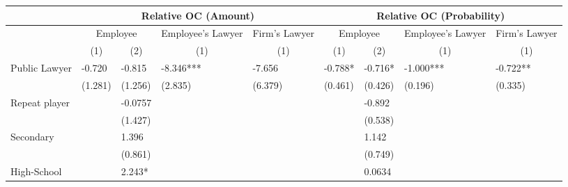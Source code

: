 \begin{tabular}{lrrrrrrrr}
\toprule
      & \multicolumn{4}{c}{Relative OC (Amount)} & \multicolumn{4}{c}{Relative OC (Probability)} \\
\midrule
      & \multicolumn{2}{c}{Employee} & \multicolumn{1}{c}{Employee's Lawyer} & \multicolumn{1}{c}{Firm's  Lawyer} & \multicolumn{2}{c}{Employee} & \multicolumn{1}{c}{Employee's Lawyer} & \multicolumn{1}{c}{Firm's  Lawyer} \\
      & \multicolumn{1}{c}{(1)} & \multicolumn{1}{c}{(2)} & \multicolumn{1}{c}{(1)} & \multicolumn{1}{c}{(1)} & \multicolumn{1}{c}{(1)} & \multicolumn{1}{c}{(2)} & \multicolumn{1}{c}{(1)} & \multicolumn{1}{c}{(1)} \\
      \midrule
Public Lawyer & \multicolumn{1}{l}{-0.720} & \multicolumn{1}{l}{-0.815} & \multicolumn{1}{l}{-8.346***} & \multicolumn{1}{l}{-7.656} & \multicolumn{1}{l}{-0.788*} & \multicolumn{1}{l}{-0.716*} & \multicolumn{1}{l}{-1.000***} & \multicolumn{1}{l}{-0.722**} \\
      & \multicolumn{1}{l}{(1.281)} & \multicolumn{1}{l}{(1.256)} & \multicolumn{1}{l}{(2.835)} & \multicolumn{1}{l}{(6.379)} & \multicolumn{1}{l}{(0.461)} & \multicolumn{1}{l}{(0.426)} & \multicolumn{1}{l}{(0.196)} & \multicolumn{1}{l}{(0.335)} \\
Repeat player & \multicolumn{1}{l}{} & \multicolumn{1}{l}{-0.0757} & \multicolumn{1}{l}{} & \multicolumn{1}{l}{} & \multicolumn{1}{l}{} & \multicolumn{1}{l}{-0.892} & \multicolumn{1}{l}{} & \multicolumn{1}{l}{} \\
      & \multicolumn{1}{l}{} & \multicolumn{1}{l}{(1.427)} & \multicolumn{1}{l}{} & \multicolumn{1}{l}{} & \multicolumn{1}{l}{} & \multicolumn{1}{l}{(0.538)} & \multicolumn{1}{l}{} & \multicolumn{1}{l}{} \\
Secondary & \multicolumn{1}{l}{} & \multicolumn{1}{l}{1.396} & \multicolumn{1}{l}{} & \multicolumn{1}{l}{} & \multicolumn{1}{l}{} & \multicolumn{1}{l}{1.142} & \multicolumn{1}{l}{} & \multicolumn{1}{l}{} \\
      & \multicolumn{1}{l}{} & \multicolumn{1}{l}{(0.861)} & \multicolumn{1}{l}{} & \multicolumn{1}{l}{} & \multicolumn{1}{l}{} & \multicolumn{1}{l}{(0.749)} & \multicolumn{1}{l}{} & \multicolumn{1}{l}{} \\
High-School & \multicolumn{1}{l}{} & \multicolumn{1}{l}{2.243*} & \multicolumn{1}{l}{} & \multicolumn{1}{l}{} & \multicolumn{1}{l}{} & \multicolumn{1}{l}{0.0634} & \multicolumn{1}{l}{} & \multicolumn{1}{l}{} \\

\end{tabular}
